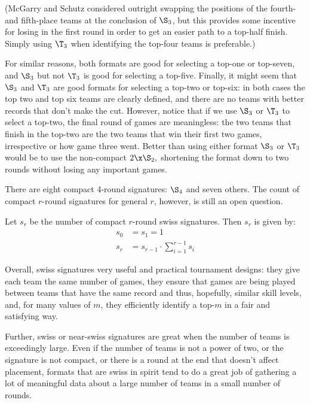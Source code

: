{(McGarry and Schutz \cite{four_five_swap} considered outright swapping the positions of the fourth- and fifth-place teams at the conclusion of $\S_3$, but this provides some incentive for losing in the first round in order to get an easier path to a top-half finish. Simply using $\T_3$ when identifying the top-four teams is preferable.)

For similar reasons, both formats are good for selecting a top-one or top-seven, and $\S_3$ but not $\T_3$ is good for selecting a top-five. Finally, it might seem that $\S_3$ and $\T_3$ are good formats for selecting a top-two or top-six: in both cases the top two and top six teams are clearly defined, and there are no teams with better records that don't make the cut. However, notice that if we use $\S_3$ or $\T_3$ to select a top-two, the final round of games are meaningless: the two teams that finish in the top-two are the two teams that win their first two games, irrespective or how game three went. Better than using either format $\S_3$ or $\T_3$ would be to use the non-compact $2\x\S_2,$ shortening the format down to two rounds without losing any important games.

There are eight compact 4-round signatures: $\S_4$ and seven others. The count of compact $r$-round signatures for general $r$, however, is still an open question.

\begin{conj}{}{}
    Let $s_r$ be the number of compact $r$-round swiss signatures. Then $s_r$ is given by:
    \begin{align*}
        s_0 &= s_ 1 = 1\\
        s_r &= s_{r-1} \cdot \sum_{i=1}^{r-1}s_i
    \end{align*}
\end{conj}

Overall, swiss signatures very useful and practical tournament designs: they give each team the same number of games, they ensure that games are being played between teams that have the same record and thus, hopefully, similar skill levels, and, for many values of $m$, they efficiently identify a top-$m$ in a fair and satisfying way.

Further, swiss or near-swiss signatures are great when the number of teams is exceedingly large. Even if the number of teams is not a power of two, or the signature is not compact, or there is a round at the end that doesn't affect placement, formats that are swiss in spirit tend to do a great job of gathering a lot of meaningful data about a large number of teams in a small number of rounds.








}
